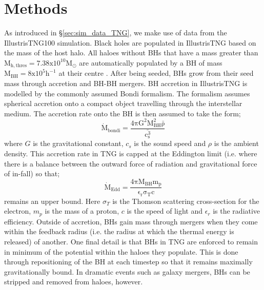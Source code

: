 \section{Methods} \label{sec:methods_BH}
As introduced in \S\ref{sec:sim_data_TNG}, we make use of data from the IllustrisTNG100 simulation. Black holes are populated in IllustrisTNG based on the mass of the host halo. All haloes without BHs that have a mass greater than $\mathrm{M_{h,thres} = 7.38 x 10^{10} M_{\odot} }$ are automatically populated by a BH of mass $\mathrm{M_{BH} = 8 x 10^{5} h^{-1}}$ at their centre \citep[termed halo-based BH formation, see also;][]{sijacki2009, dimatteo2012, hirschmann2014, sijacki2015}. After being seeded, BHs grow from their seed mass through accretion and BH-BH mergers. BH accretion in IllustrisTNG is modelled by the commonly assumed Bondi formalism. The formalism assumes spherical accretion onto a compact object travelling through the interstellar medium. The accretion rate onto the BH is then assumed to take the form;
\begin{equation}
\mathrm{\dot{M}_{bondi} = \frac{4\pi G^{2} M_{BH}^{2} \bar{\rho}}{\bar{c^{3}_{s}}}}
\end{equation}
where $G$ is the gravitational constant, $c_{s}$ is the sound speed and $\rho$ is the ambient density. This accretion rate in TNG is capped at the Eddington limit (i.e. where there is a balance between the outward force of radiation and gravitational force of in-fall) so that;
\begin{equation}
\mathrm{\dot{M}_{Edd} = \frac{4\pi M_{BH} m_p}{\epsilon_r \sigma_T c} }
\end{equation}
remains an upper bound. Here $\sigma_T$ is the Thomson scattering cross-section for the electron, $m_p$ is the mass of a proton, $c$ is the speed of light and $\epsilon_r$ is the radiative efficiency. Outside of accretion, BHs gain mass through mergers when they come within the feedback radius (i.e. the radius at which the thermal energy is released) of another. One final detail is that BHs in TNG are enforced to remain in minimum of the potential within the haloes they populate. This is done through repositioning of the BH at each timestep so that it remains maximally gravitationally bound. In dramatic events such as galaxy mergers, BHs can be stripped and removed from haloes, however. 


